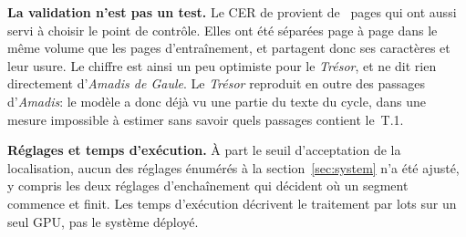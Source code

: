 \textbf{La validation n'est pas un test.} Le CER de \trainCer{} provient de
\trainPagesVal{}~pages qui ont aussi servi à choisir le point de contrôle.
Elles ont été séparées page à page dans le même volume que les pages
d'entraînement, et partagent donc ses caractères et leur usure. Le chiffre est
ainsi un peu optimiste pour le \emph{Trésor}, et ne dit rien directement
d'\emph{Amadis de Gaule}. Le \emph{Trésor} reproduit en outre des passages
d'\emph{Amadis}: le modèle a donc déjà vu une partie du texte du cycle, dans une
mesure impossible à estimer sans savoir quels passages contient le~T.1.

\textbf{Réglages et temps d'exécution.} À part le seuil d'acceptation de la
localisation, aucun des réglages énumérés à la section~\ref{sec:system} n'a
été ajusté, y compris les deux réglages d'enchaînement qui décident où un
segment commence et finit. Les temps d'exécution décrivent le traitement par
lots sur un seul GPU, pas le système déployé.
